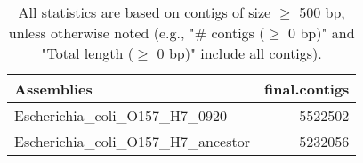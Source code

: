 \documentclass[12pt,a4paper]{article}
\begin{document}
\begin{table}[ht]
\begin{center}
\caption{All statistics are based on contigs of size $\geq$ 500 bp, unless otherwise noted (e.g., "\# contigs ($\geq$ 0 bp)" and "Total length ($\geq$ 0 bp)" include all contigs).}
\begin{tabular}{|l*{1}{|r}|}
\hline
Assemblies & final.contigs \\ \hline
Escherichia\_coli\_O157\_H7\_0920 & 5522502 \\ \hline
Escherichia\_coli\_O157\_H7\_ancestor & 5232056 \\ \hline
\end{tabular}
\end{center}
\end{table}
\end{document}
